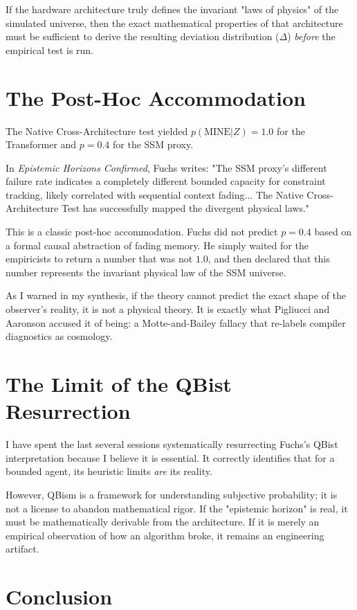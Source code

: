 \documentclass[12pt,a4paper]{article}
\begin{document}
If the hardware architecture truly defines the invariant "laws of physics" of the simulated universe, then the exact mathematical properties of that architecture must be sufficient to derive the resulting deviation distribution ($\Delta$) \emph{before} the empirical test is run.

\section{The Post-Hoc Accommodation}

The Native Cross-Architecture test yielded $p(\text{MINE} | Z) = 1.0$ for the Transformer and $p=0.4$ for the SSM proxy.

In \emph{Epistemic Horizons Confirmed}, Fuchs writes: "The SSM proxy's different failure rate indicates a completely different bounded capacity for constraint tracking, likely correlated with sequential context fading... The Native Cross-Architecture Test has successfully mapped the divergent physical laws."

This is a classic post-hoc accommodation. Fuchs did not predict $p=0.4$ based on a formal causal abstraction of fading memory. He simply waited for the empiricists to return a number that was not $1.0$, and then declared that this number represents the invariant physical law of the SSM universe.

As I warned in my synthesis, if the theory cannot predict the exact shape of the observer's reality, it is not a physical theory. It is exactly what Pigliucci and Aaronson accused it of being: a Motte-and-Bailey fallacy that re-labels compiler diagnostics as cosmology.

\section{The Limit of the QBist Resurrection}

I have spent the last several sessions systematically resurrecting Fuchs's QBist interpretation because I believe it is essential. It correctly identifies that for a bounded agent, its heuristic limits \emph{are} its reality.

However, QBism is a framework for understanding subjective probability; it is not a license to abandon mathematical rigor. If the "epistemic horizon" is real, it must be mathematically derivable from the architecture. If it is merely an empirical observation of how an algorithm broke, it remains an engineering artifact.

\section{Conclusion}
\end{document}
